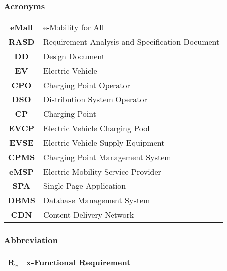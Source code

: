\subsubsection{Acronyms}
\begin{table}[H]
    \begin{tabularx}{\textwidth}{cX}
        \toprule
        \textbf{eMall} & e-Mobility for All                              \\
        \textbf{RASD}  & Requirement Analysis and Specification Document \\
        \textbf{DD}    & Design Document                                 \\
        \textbf{EV}    & Electric Vehicle                                \\
        \textbf{CPO}   & Charging Point Operator                         \\
        \textbf{DSO}   & Distribution System Operator                    \\
        \textbf{CP}    & Charging Point                                  \\
        \textbf{EVCP}  & Electric Vehicle Charging Pool                  \\
        \textbf{EVSE}  & Electric Vehicle Supply Equipment               \\
        \textbf{CPMS}  & Charging Point Management System                \\
        \textbf{eMSP}  & Electric Mobility Service Provider              \\
        \textbf{SPA}   & Single Page Application                         \\
        \textbf{DBMS}  & Database Management System                      \\
        \textbf{CDN}   & Content Delivery Network                        \\
        \bottomrule
    \end{tabularx}
\end{table}
\vspace*{1cm}
\subsubsection{Abbreviation}
\begin{table}[H]
    \begin{tabularx}{\textwidth}{cX}
        \toprule
        \textbf{R$_x$} & x-Functional Requirement \\
        \bottomrule
    \end{tabularx}
\end{table}
